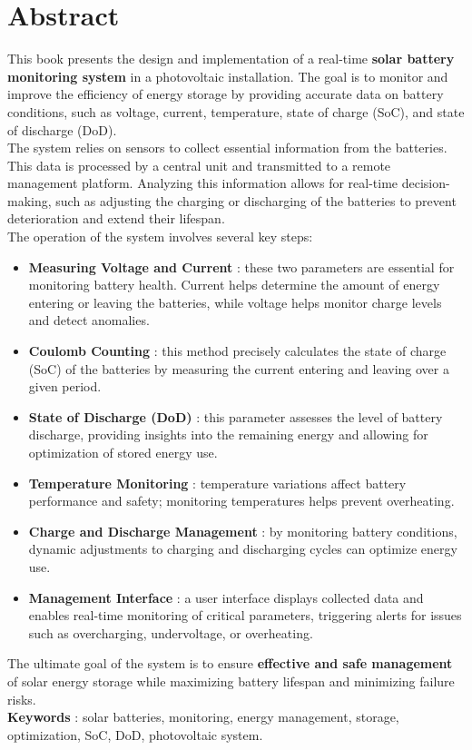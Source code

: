 \chapter*{Abstract}
{}

This book presents the design and implementation of a real-time \textbf{solar battery monitoring system} in a photovoltaic installation. The goal is to monitor and improve the efficiency of energy storage by providing accurate data on battery conditions, such as voltage, current, temperature, state of charge (SoC), and state of discharge (DoD).\\

The system relies on sensors to collect essential information from the batteries. This data is processed by a central unit and transmitted to a remote management platform. Analyzing this information allows for real-time decision-making, such as adjusting the charging or discharging of the batteries to prevent deterioration and extend their lifespan.\\

The operation of the system involves several key steps:
\begin{itemize}
	\item \textbf{Measuring Voltage and Current} : these two parameters are essential for monitoring battery health. Current helps determine the amount of energy entering or leaving the batteries, while voltage helps monitor charge levels and detect anomalies.
	\item \textbf{Coulomb Counting} : this method precisely calculates the state of charge (SoC) of the batteries by measuring the current entering and leaving over a given period.
	\item \textbf{State of Discharge (DoD)} : this parameter assesses the level of battery discharge, providing insights into the remaining energy and allowing for optimization of stored energy use.
	\item \textbf{Temperature Monitoring} : temperature variations affect battery performance and safety; monitoring temperatures helps prevent overheating.
	\item \textbf{Charge and Discharge Management} : by monitoring battery conditions, dynamic adjustments to charging and discharging cycles can optimize energy use.
	\item \textbf{Management Interface} : a user interface displays collected data and enables real-time monitoring of critical parameters, triggering alerts for issues such as overcharging, undervoltage, or overheating.
\end{itemize}

The ultimate goal of the system is to ensure \textbf{effective and safe management} of solar energy storage while maximizing battery lifespan and minimizing failure risks.\\

\textbf{Keywords} : solar batteries, monitoring, energy management, storage, optimization, SoC, DoD, photovoltaic system.
